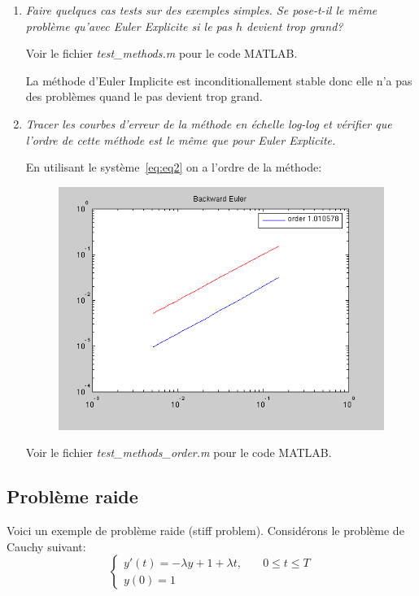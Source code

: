 \documentclass[a4paper,10pt]{article}
\begin{document}
\begin{enumerate}
    \item \emph{Faire quelques cas tests sur des exemples simples. Se pose-t-il le
    même problème qu'avec Euler Explicite si le pas $h$ devient trop grand?}

    Voir le fichier \emph{test\_methods.m} pour le code MATLAB.

    La méthode d'Euler Implicite est inconditionallement stable donc elle n'a pas
    des problèmes quand le pas devient trop grand.

    \item \emph{Tracer les courbes d'erreur de la méthode en échelle log-log et
    vérifier que l'ordre de cette méthode est le même que pour Euler Explicite.}

    En utilisant le système~\eqref{eq:eq2} on a l'ordre de la méthode:
\begin{figure}[h!]
    \centering
    \includegraphics[scale=0.5]{./img/order-backward-euler.png}
\end{figure}

    Voir le fichier \emph{test\_methods\_order.m} pour le code MATLAB.
\end{enumerate}

\subsection{Problème raide}

Voici un exemple de problème raide (stiff problem). Considérons le problème de
Cauchy suivant:
\begin{equation}\label{eq:raide}
\left\{
\begin{array}{ll}
    y'(t) = -\lambda y + 1 + \lambda t, & \quad 0 \leq t \leq T \\
    y(0) = 1 &
\end{array}
\right.
\end{equation}
\end{document}
